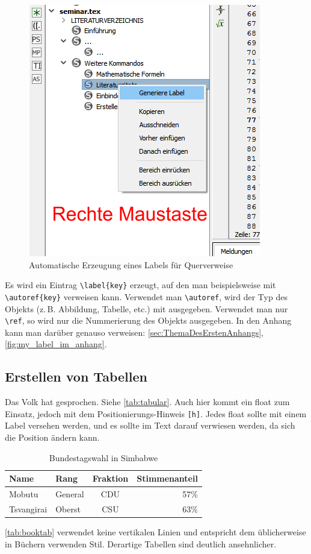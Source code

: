 \begin{figure}
\centering
\includegraphics[width=0.4\linewidth]{bilder/LabelErzeugen}
\caption{Automatische Erzeugung eines Labels für Querverweise}
\label{fig:LabelErzeugen}
\end{figure}

Es wird ein Eintrag \verb|\label{key}| erzeugt, auf den man beispielsweise mit
\verb|\autoref{key}| verweisen kann. Verwendet man \verb|\autoref|, wird der Typ des Objekts
(z.\,B. Abbildung, Tabelle, etc.) mit ausgegeben. Verwendet man nur \verb|\ref|,
so wird nur die Nummerierung des Objekts ausgegeben. In den Anhang kann man darüber genauso verweisen: \autoref{sec:ThemaDesErstenAnhangs}, \autoref{fig:my_label_im_anhang}.

\subsection{Erstellen von Tabellen}

Das Volk hat gesprochen. Siehe \autoref{tab:tabular}. Auch hier kommt ein float zum Einsatz, jedoch mit dem Positionierungs-Hinweis \verb|[h]|. Jedes float sollte mit einem Label versehen werden, und es sollte im Text darauf verwiesen werden, da sich die Position ändern kann.

\begin{table}[h]
\centering
\begin{tabular} {|llc||r|}
	\hline
	Name & Rang & Fraktion & Stimmenanteil \\
	\hline
	Mobutu & General & CDU & 57\% \\
	Tsvangirai & Oberst & CSU & 63\% \\
	\hline
\end{tabular}
\caption {Bundestagswahl in Simbabwe}
\label{tab:tabular}
\end{table}

\autoref{tab:booktab} verwendet keine vertikalen Linien und entspricht dem üblicherweise in Büchern verwenden Stil. Derartige Tabellen sind deutlich ansehnlicher.

